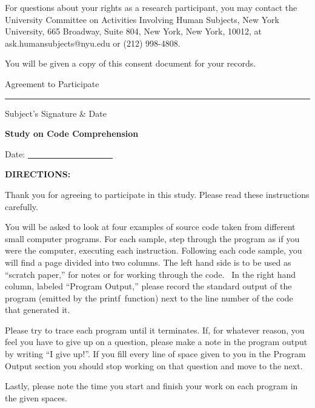 \documentclass[12pt, a4paper, oneside]{article}
\begin{document}
For questions about your rights as a research participant, you may
contact the University Committee on Activities Involving Human Subjects,
New York University, 665 Broadway, Suite 804, New York, New York, 10012,
at ask.humansubjects@nyu.edu or (212) 998-4808.

You will be given a copy of this consent document for your records.

\vspace{20pt}

Agreement to Participate

\vspace{20pt}

\rule{0.7\linewidth}{\linethickness}

Subject's Signature \& Date

\pagebreak

\begin{center}\textbf{Study on Code Comprehension}\end{center}

\vspace{20pt}

Date: \underline{~~~~~~~~~~~~~~~~~~~~}

\vspace{20pt}

\textbf{DIRECTIONS:}

{Thank you for agreeing to participate in this study. Please read these
instructions carefully.}

{You will be asked to look at four examples of source code taken from
different small computer programs. For each sample, }{step through the
program as if you were the computer, executing each instruction.
Following each code sample, you will find a page divided into two
columns. The left hand side is to be used as ``scratch paper,'' for
notes or for working through the code. ~In the right hand column,
labeled ``Program Output,'' please record the standard output of the
program (emitted by the }{printf}{~function) next to the line number of
the code that generated it.}

Please try to trace each program until it terminates. If, for whatever reason,
you feel you have to give up on a question, please make a note in the program
output by writing ``I give up!''. If you fill every line of space given to you
in the Program Output section you should stop working on that question and move
to the next.

Lastly, please note the time you start and finish your work on each program in
the given spaces.
\end{document}
